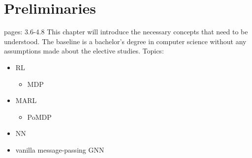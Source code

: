 
\chapter{Preliminaries}
pages: 3.6-4.8
This chapter will introduce the necessary concepts that need to be understood. The baseline is a bachelor's degree in computer science without any assumptions made about the elective studies.
Topics:
\begin{itemize}[noitemsep,nolistsep]
	\item RL
	\begin{itemize}[noitemsep,nolistsep]
		\item MDP
	\end{itemize}
	\item MARL
	\begin{itemize}[noitemsep,nolistsep]
		\item PoMDP
	\end{itemize}
	\item NN
	\item vanilla message-passing GNN
\end{itemize}